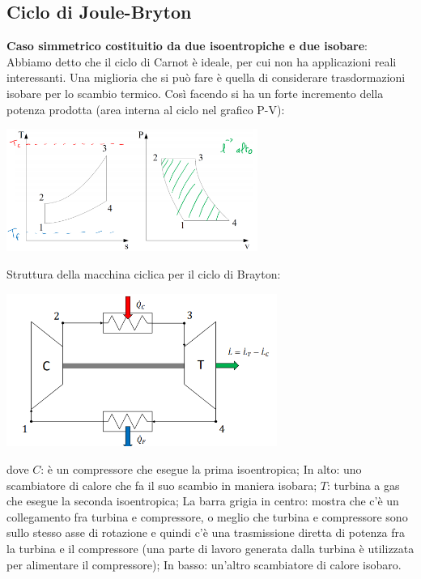 \subsection{Ciclo di Joule-Bryton}
\textbf{Caso simmetrico costituitio da due isoentropiche e due isobare}:\newline
Abbiamo detto che il ciclo di Carnot è ideale, per cui non ha applicazioni reali interessanti. Una miglioria che si può fare è quella di considerare trasdormazioni isobare per lo scambio termico. Così facendo si ha un forte incremento della potenza prodotta (area interna al ciclo nel grafico P-V):
\begin{center}
    \includegraphics[height=4cm]{../L07/img5.PNG}
\end{center}
Struttura della macchina ciclica per il ciclo di Brayton:
\begin{center}
    \includegraphics[height=5cm]{../L07/img6.PNG}
\end{center}
dove \newline
$C$: è un compressore che esegue la prima isoentropica;\newline
In alto: uno scambiatore di calore che fa il suo scambio in maniera isobara;\newline
$T$: turbina a gas che esegue la seconda isoentropica;\newline
La barra grigia in centro: mostra che c'è un collegamento fra turbina e compressore, o meglio che turbina e compressore sono sullo stesso asse di rotazione e quindi c'è una trasmissione diretta di potenza fra la turbina e il compressore (una parte di lavoro generata dalla turbina è utilizzata per alimentare il compressore);\newline
In basso: un'altro scambiatore di calore isobaro.\newline
\newline
